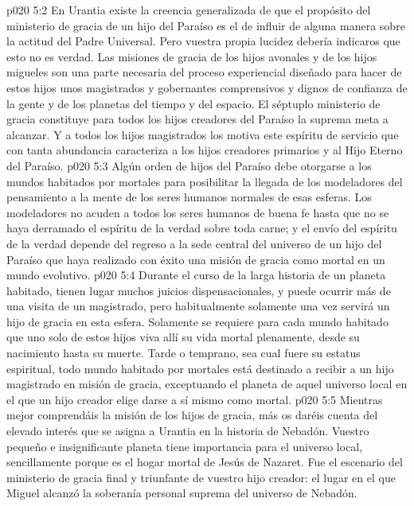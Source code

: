 \vs p020 5:2 En Urantia existe la creencia generalizada de que el propósito del ministerio de gracia de un hijo del Paraíso es el de influir de alguna manera sobre la actitud del Padre Universal. Pero vuestra propia lucidez debería indicaros que esto no es verdad. Las misiones de gracia de los hijos avonales y de los hijos migueles son una parte necesaria del proceso experiencial diseñado para hacer de estos hijos unos magistrados y gobernantes comprensivos y dignos de confianza de la gente y de los planetas del tiempo y del espacio. El séptuplo ministerio de gracia constituye para todos los hijos creadores del Paraíso la suprema meta a alcanzar. Y a todos los hijos magistrados los motiva este espíritu de servicio que con tanta abundancia caracteriza a los hijos creadores primarios y al Hijo Eterno del Paraíso.
\vs p020 5:3 Algún orden de hijos del Paraíso debe otorgarse a los mundos habitados por mortales para posibilitar la llegada de los modeladores del pensamiento a la mente de  los seres humanos normales de esas esferas. Los modeladores no acuden a todos los seres humanos de buena fe hasta que no se haya derramado el espíritu de la verdad sobre toda carne; y el envío del espíritu de la verdad depende del regreso a la sede central del universo de un hijo del Paraíso que haya realizado con éxito una misión de gracia como mortal en un mundo evolutivo.
\vs p020 5:4 Durante el curso de la larga historia de un planeta habitado, tienen lugar muchos juicios dispensacionales, y puede ocurrir más de una visita de un magistrado, pero habitualmente solamente una vez servirá un hijo de gracia en esta esfera. Solamente se requiere para cada mundo habitado que uno solo de estos hijos viva allí su vida mortal plenamente, desde su nacimiento hasta su muerte. Tarde o temprano, sea cual fuere su estatus espiritual, todo mundo habitado por mortales está destinado a recibir a un hijo magistrado en misión de gracia, exceptuando el planeta de aquel universo local en el que un hijo creador elige darse a sí mismo como mortal.
\vs p020 5:5 \pc Mientras mejor comprendáis la misión de los hijos de gracia, más os daréis cuenta del elevado interés que se asigna a Urantia en la historia de Nebadón. Vuestro pequeño e insignificante planeta tiene importancia para el universo local, sencillamente porque es el hogar mortal de Jesús de Nazaret. Fue el escenario del ministerio de gracia final y triunfante de vuestro hijo creador: el lugar en el que Miguel alcanzó la soberanía personal suprema del universo de Nebadón.
